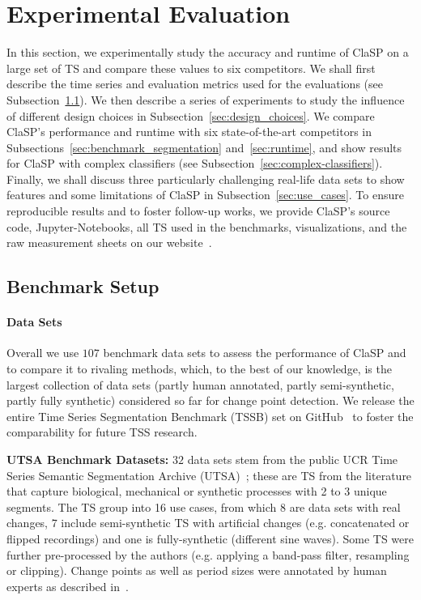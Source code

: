 \documentclass[pdflatex,sn-basic]{sn-jnl}
\begin{document}
\section{Experimental Evaluation}\label{sec:experiments}

In this section, we experimentally study the accuracy and runtime of ClaSP on a large set of TS and compare these values to six competitors. We shall first describe the time series and evaluation metrics used for the evaluations (see Subsection~\ref{sec:setup}). We then describe a series of experiments to study the influence of different design choices in Subsection~\ref{sec:design_choices}. We compare ClaSP’s performance and runtime with six state-of-the-art competitors in Subsections~\ref{sec:benchmark_segmentation} and~\ref{sec:runtime}, and show results for ClaSP with complex classifiers (see Subsection~\ref{sec:complex-classifiers}). Finally, we shall discuss three particularly challenging real-life data sets to show features and some limitations of ClaSP in Subsection~\ref{sec:use_cases}. To ensure reproducible results and to foster follow-up works, we provide ClaSP's source code, Jupyter-Notebooks, all TS used in the benchmarks, visualizations, and the raw measurement sheets on our website~\citep{ClaSPWebpage}.


\subsection{Benchmark Setup}
\label{sec:setup}

\paragraph{Data Sets}
Overall we use $107$ benchmark data sets to assess the performance of ClaSP and to compare it to rivaling methods, which, to the best of our knowledge, is the largest collection of data sets (partly human annotated, partly semi-synthetic, partly fully synthetic) considered so far for change point detection. We release the entire Time Series Segmentation Benchmark (TSSB) set on GitHub~\citep{TSSBWebpage} to foster the comparability for future TSS research.

\textbf{UTSA Benchmark Datasets:} $32$ data sets stem from the public UCR Time Series Semantic Segmentation Archive (UTSA)~\citep{gharghabi2017matrix}; these are TS from the literature that capture biological, mechanical or synthetic processes with 2 to 3 unique segments. The TS group into 16 use cases, from which $8$ are data sets with real changes, $7$ include semi-synthetic TS with artificial changes (e.g. concatenated or flipped recordings) and one is fully-synthetic (different sine waves). Some TS were further pre-processed by the authors (e.g. applying a band-pass filter, resampling or clipping). Change points as well as period sizes were annotated by human experts as described in~\citep{gharghabi2017matrix}.
\end{document}
